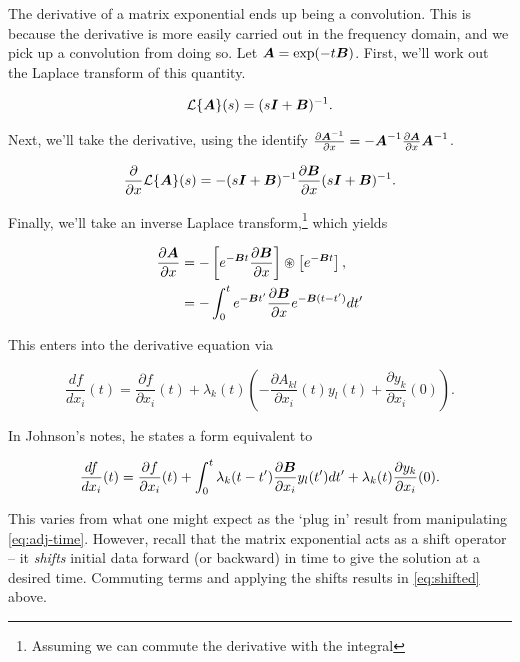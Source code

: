 \documentclass[../primer.tex]{subfiles}
\begin{document}
The derivative of a matrix exponential ends up being a convolution. This is
because the derivative is more easily carried out in the frequency domain, and
we pick up a convolution from doing so. Let \(\boldsymbol{A}=\exp(-t\boldsymbol{B})\). First,
we'll work out the Laplace transform of this quantity.

\begin{equation}
  \mathcal{L}\{\boldsymbol{A}\}(s) = (s\boldsymbol{I}+\boldsymbol{B})^{-1}.
\end{equation}

\noindent Next, we'll take the derivative, using the identify
\(\frac{\partial\boldsymbol{A}^{-1}}{\partial
x}=\nobreak-\boldsymbol{A}^{-1}\frac{\partial\boldsymbol{A}}{\partial x}\boldsymbol{A}^{-1}\).

\begin{equation}
  \frac{\partial}{\partial x}\cL\{\mA\}(s) = %
    -(s\mI+\mB)^{-1}\frac{\partial\mB}{\partial x}(s\mI+\mB)^{-1}.
\end{equation}

\noindent Finally, we'll take an inverse Laplace transform,\footnote{Assuming we can
commute the derivative with the integral} which yields

\begin{equation}\begin{aligned}
  \frac{\partial\mA}{\partial x} &= -\left[e^{-\mB t}\frac{\partial\mB}{\partial x}\right] %
    \circledast \left[e^{-\mB t}\right], \\
    &= -\int_0^t e^{-\mB t'}\frac{\partial\mB}{\partial x}e^{-\mB(t-t')}dt'
\end{aligned}\end{equation}

This enters into the derivative equation via

\begin{equation}\label{eq:adj-time}
  \frac{df}{dx_i}(t) = \frac{\partial f}{\partial x_i}(t) + \lambda_k(t)%
    \left(-\frac{\partial A_{kl}}{\partial x_i}(t) y_l(t) + \frac{\partial y_k}{\partial x_i}(0)\right).
\end{equation}

In Johnson's notes, he states a form equivalent to

\begin{equation}\label{eq:shifted}
  \frac{df}{dx_i}(t) = \frac{\partial f}{\partial x_i}(t) + %
    \int_0^t\lambda_k(t-t')\frac{\partial\mB}{\partial x_i}y_l(t')dt' + %
    \lambda_k(t)\frac{\partial y_k}{\partial x_i}(0).
\end{equation}

This varies from what one might expect as the `plug in' result from manipulating
\eqref{eq:adj-time}. However, recall that the matrix exponential acts as a shift
operator -- it \emph{shifts} initial data forward (or backward) in time to give the
solution at a desired time. Commuting terms and applying the shifts results in
\eqref{eq:shifted} above.
\end{document}
